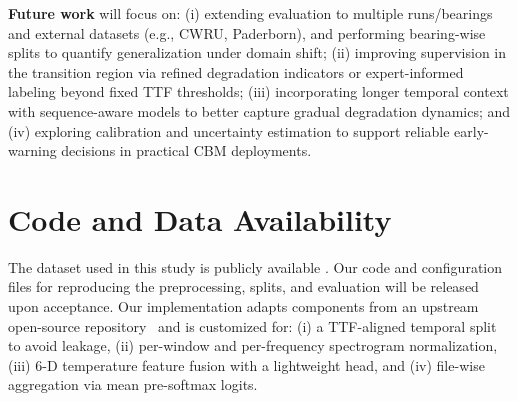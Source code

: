 \documentclass{article}
\begin{document}
\textbf{Future work} will focus on: (i) extending evaluation to multiple runs/bearings and external datasets (e.g., CWRU, Paderborn), and performing bearing-wise splits to quantify generalization under domain shift; (ii) improving supervision in the transition region via refined degradation indicators or expert-informed labeling beyond fixed TTF thresholds; (iii) incorporating longer temporal context with sequence-aware models to better capture gradual degradation dynamics; and (iv) exploring calibration and uncertainty estimation to support reliable early-warning decisions in practical CBM deployments.

\section*{Code and Data Availability}
The dataset used in this study is publicly available \cite{jung2024dib_rtf,jung2024mendeley_rtf}. Our code and configuration files for reproducing the preprocessing, splits, and evaluation will be released upon acceptance. Our implementation adapts components from an upstream open-source repository~\cite{mdzalfirdausi_paderborn_repo} and is customized for: (i) a TTF-aligned temporal split to avoid leakage, (ii) per-window and per-frequency spectrogram normalization, (iii) 6-D temperature feature fusion with a lightweight head, and (iv) file-wise aggregation via mean pre-softmax logits.


\end{document}
